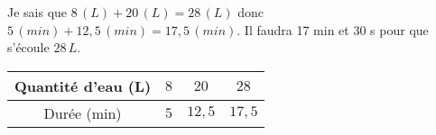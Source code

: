 \begin{pageCours}
\begin{Ex}
Je sais que $8\,(L)+20\,(L)=28\,(L)$ donc $5\,(min)+12,5\,(min)=17,5\,(min)$. Il faudra 17 min et 30 s pour que s'écoule $28\,L$.\\
\begin{center}
    \begin{tabular}{|c|c|c|c|}\hline 
        Quantité d'eau (L) & $8$ & $20$ & $28$  \\\hline 
        Durée (min) & $5$ & $12,5$ & $17,5$ \\\hline 
    \end{tabular}
\end{center}
\end{Ex}



\end{pageCours} 
